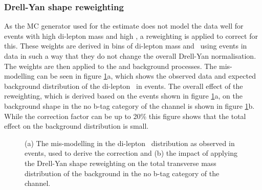 \subsubsection*{Drell-Yan shape reweighting}
As the \ac{MC} generator used for the \Ztautau estimate
does not model the data well for events with high di-lepton
mass and high \pT, a reweighting is applied to correct for this.
These weights are derived in bins of di-lepton mass and 
\pT~using \Zmm events in data in such a way that they do not
change the overall Drell-Yan normalisation. The weights
are then applied to the \Ztautau and \Zellell background processes.
The mis-modelling can be seen in figure \ref{fig:dyrwt}a, which
shows the observed data and expected background distribution of the di-lepton \pT~in
\Zmm events. The overall effect of the reweighting, which is derived
based on the events shown in figure \ref{fig:dyrwt}a, on the \Ztautau background
shape in the no b-tag category of the \etau channel is shown in figure \ref{fig:dyrwt}b.
While the correction factor can be up to 20\% this figure shows
that the total effect on the \Ztautau background distribution is small.
\begin{figure}[h!]
\begin{center}
\end{center}
\caption[The mis-modelling in the di-lepton \pT~distribution as observed
in \Zmm events, and the impact of applying the Drell-Yan shape reweighting
on the total transverse mass distribution of the \Ztautau background in the no b-tag category of the \etau channel.]{(a) The mis-modelling in the di-lepton \pT~distribution as observed
in \Zmm events, used to derive the correction and (b) the impact of applying the Drell-Yan shape
reweighting on the total transverse
mass distribution of the \Ztautau background in the no b-tag category of the \etau channel.}
\label{fig:dyrwt}
\end{figure}


